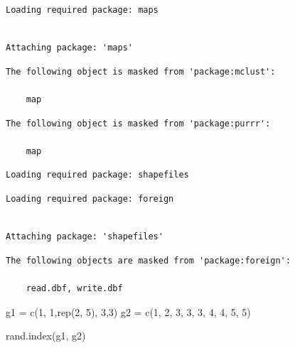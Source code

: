 \documentclass{article}
\newenvironment{Shaded}{\begin{snugshade}}{\end{snugshade}}
\newcommand{\DecValTok}[1]{\textcolor[rgb]{0.68,0.00,0.00}{#1}}
\newcommand{\FunctionTok}[1]{\textcolor[rgb]{0.28,0.35,0.67}{#1}}
\newcommand{\NormalTok}[1]{\textcolor[rgb]{0.00,0.23,0.31}{#1}}
\newcommand{\OtherTok}[1]{\textcolor[rgb]{0.00,0.23,0.31}{#1}}
\begin{document}
\begin{verbatim}
Loading required package: maps
\end{verbatim}

\begin{verbatim}

Attaching package: 'maps'
\end{verbatim}

\begin{verbatim}
The following object is masked from 'package:mclust':

    map
\end{verbatim}

\begin{verbatim}
The following object is masked from 'package:purrr':

    map
\end{verbatim}

\begin{verbatim}
Loading required package: shapefiles
\end{verbatim}

\begin{verbatim}
Loading required package: foreign
\end{verbatim}

\begin{verbatim}

Attaching package: 'shapefiles'
\end{verbatim}

\begin{verbatim}
The following objects are masked from 'package:foreign':

    read.dbf, write.dbf
\end{verbatim}

\begin{Shaded}
\begin{Highlighting}[]
\NormalTok{g1 }\OtherTok{=} \FunctionTok{c}\NormalTok{(}\DecValTok{1}\NormalTok{, }\DecValTok{1}\NormalTok{,}\FunctionTok{rep}\NormalTok{(}\DecValTok{2}\NormalTok{, }\DecValTok{5}\NormalTok{), }\DecValTok{3}\NormalTok{,}\DecValTok{3}\NormalTok{)}
\NormalTok{g2 }\OtherTok{=} \FunctionTok{c}\NormalTok{(}\DecValTok{1}\NormalTok{, }\DecValTok{2}\NormalTok{, }\DecValTok{3}\NormalTok{, }\DecValTok{3}\NormalTok{, }\DecValTok{3}\NormalTok{, }\DecValTok{4}\NormalTok{, }\DecValTok{4}\NormalTok{, }\DecValTok{5}\NormalTok{, }\DecValTok{5}\NormalTok{)}

\FunctionTok{rand.index}\NormalTok{(g1, g2)}
\end{Highlighting}
\end{Shaded}
\end{document}
